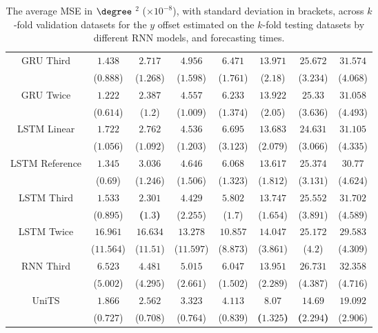 \begin{table}[!ht]
{\begin{tabular}{|c|c|c|c|c|c|c|c|}
			\multirow{2}{*}{GRU Third} & $1.438$ & $2.717$ & $4.956$ & $6.471$ & $13.971$ & $25.672$ & $31.574$ \\
			 & ($0.888$) & ($1.268$) & ($1.598$) & ($1.761$) & ($2.18$) & ($3.234$) & ($4.068$) \\ \hline
			\multirow{2}{*}{GRU Twice} & $1.222$ & $2.387$ & $4.557$ & $6.233$ & $13.922$ & $25.33$ & $31.058$ \\
			 & ($0.614$) & ($1.2$) & ($1.009$) & ($1.374$) & ($2.05$) & ($3.636$) & ($4.493$) \\ \hline
			\multirow{2}{*}{LSTM Linear} & $1.722$ & $2.762$ & $4.536$ & $6.695$ & $13.683$ & $24.631$ & $31.105$ \\
			 & ($1.056$) & ($1.092$) & ($1.203$) & ($3.123$) & ($2.079$) & ($3.066$) & ($4.335$) \\ \hline
			\multirow{2}{*}{LSTM Reference} & $1.345$ & $3.036$ & $4.646$ & $6.068$ & $13.617$ & $25.374$ & $30.77$ \\
			 & ($0.69$) & ($1.246$) & ($1.506$) & ($1.323$) & ($1.812$) & ($3.131$) & ($4.624$) \\ \hline
			\multirow{2}{*}{LSTM Third} & $1.533$ & $\mathbf{2.301}$ & $4.429$ & $5.802$ & $13.747$ & $25.552$ & $31.702$ \\
			 & ($0.895$) & \textbf{(}$\mathbf{1.3}$\textbf{)} & ($2.255$) & ($1.7$) & ($1.654$) & ($3.891$) & ($4.589$) \\ \hline
			\multirow{2}{*}{LSTM Twice} & $16.961$ & $16.634$ & $13.278$ & $10.857$ & $14.047$ & $25.172$ & $29.583$ \\
			 & ($11.564$) & ($11.51$) & ($11.597$) & ($8.873$) & ($3.861$) & ($4.2$) & ($4.309$) \\ \hline
			\multirow{2}{*}{RNN Third} & $6.523$ & $4.481$ & $5.015$ & $6.047$ & $13.951$ & $26.731$ & $32.358$ \\
			 & ($5.002$) & ($4.295$) & ($2.661$) & ($1.502$) & ($2.289$) & ($4.387$) & ($4.716$) \\ \hline
			\multirow{2}{*}{UniTS} & $1.866$ & $2.562$ & $3.323$ & $4.113$ & $\mathbf{8.07}$ & $\mathbf{14.69}$ & $19.092$ \\
			 & ($0.727$) & ($0.708$) & ($0.764$) & ($0.839$) & \textbf{(}$\mathbf{1.325}$\textbf{)} & \textbf{(}$\mathbf{2.294}$\textbf{)} & ($2.906$) \\ \hline
		\end{tabular}
	}
	\caption{The average MSE in $\degree$ $^{2}$ ($\times 10^{-8}$), with standard deviation in brackets, across $k$-fold validation datasets for the $y$ offset estimated on the $k$-fold testing datasets by different RNN models, and forecasting times.}
	\label{tab:mann_whitney_latitude_no_abs_MSE}
\end{table}

